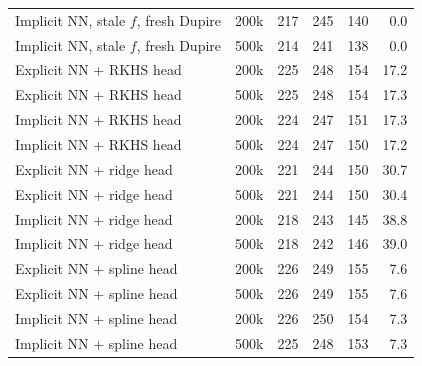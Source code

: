 \begin{tabular}{l l rr r r}
Implicit NN, stale $f$, fresh Dupire & 200k & 217 & 245 & 140 & 0.0\\
Implicit NN, stale $f$, fresh Dupire & 500k & 214 & 241 & 138 & 0.0\\
Explicit NN + RKHS head & 200k & 225 & 248 & 154 & 17.2\\
Explicit NN + RKHS head & 500k & 225 & 248 & 154 & 17.3\\
Implicit NN + RKHS head & 200k & 224 & 247 & 151 & 17.3\\
Implicit NN + RKHS head & 500k & 224 & 247 & 150 & 17.2\\
Explicit NN + ridge head & 200k & 221 & 244 & 150 & 30.7\\
Explicit NN + ridge head & 500k & 221 & 244 & 150 & 30.4\\
Implicit NN + ridge head & 200k & 218 & 243 & 145 & 38.8\\
Implicit NN + ridge head & 500k & 218 & 242 & 146 & 39.0\\
Explicit NN + spline head & 200k & 226 & 249 & 155 & 7.6\\
Explicit NN + spline head & 500k & 226 & 249 & 155 & 7.6\\
Implicit NN + spline head & 200k & 226 & 250 & 154 & 7.3\\
Implicit NN + spline head & 500k & 225 & 248 & 153 & 7.3\\
\bottomrule
\end{tabular}
